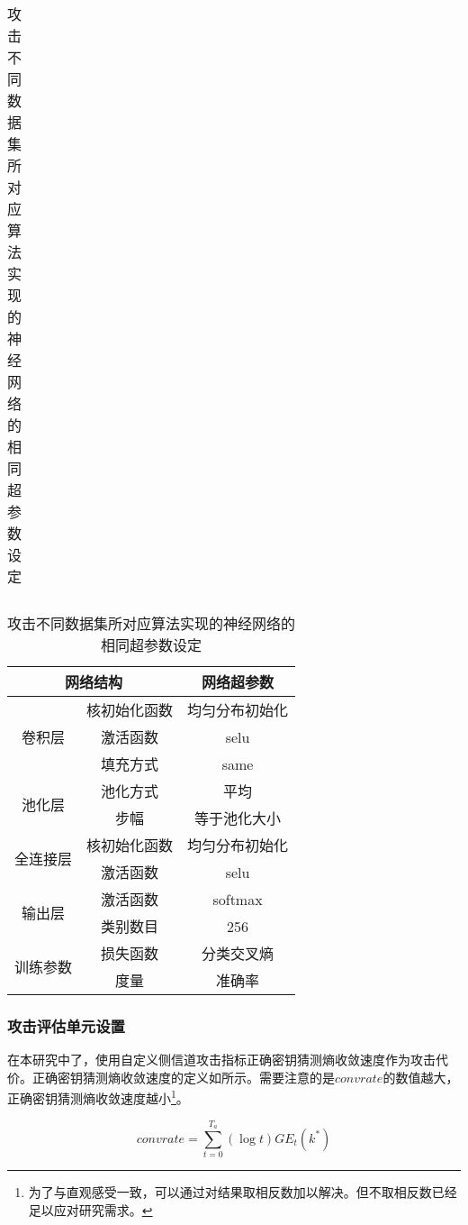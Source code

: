 {\begin{table}[!htb]
{\begin{subtable}[t]{\textwidth}
\begin{tabular}{cc|cccccc}
				\end{tabular}   
			\end{subtable}
		}
		
		\normalsize{
			\begin{subtable}[t]{\textwidth}
				\caption{攻击不同数据集所对应算法实现的神经网络的相同超参数设定}
				\centering
				\begin{tabular}{cc|c}
					\hline
					\multicolumn{2}{c|}{网络结构} &网络超参数\\
					\hline
					\hline
					\multirow{3}{*}{卷积层 }     &核初始化函数    &均匀分布初始化      \\
					                             &激活函数  &selu     \\
					                             &填充方式  &same     \\
					\hline
					\multirow{2}{*}{池化层 }     &池化方式    &平均              \\
					                             &步幅  &等于池化大小     \\
					\hline
					\multirow{2}{*}{全连接层}    &核初始化函数    &均匀分布初始化          \\
					                            &激活函数  &selu     \\
					\hline
					\multirow{2}{*}{输出层}      &激活函数    &softmax          \\
					                             &类别数目    &256                  \\
					\hline
					\multirow{2}{*}{训练参数}      &损失函数    &分类交叉熵          \\
				 	                               &度量       &准确率                  \\
					\hline
				\end{tabular}
			\end{subtable}
		}
	\end{table}
	\subsubsection{攻击评估单元设置}
	在本研究中了，使用自定义侧信道攻击指标正确密钥猜测熵收敛速度作为攻击代价。正确密钥猜测熵收敛速度的定义如所示。需要注意的是$convrate$的数值越大，正确密钥猜测熵收敛速度越小\footnote{为了与直观感受一致，可以通过对结果取相反数加以解决。但不取相反数已经足以应对研究需求。}。
	
	\begin{equation}\label{eq:mycost}
	convrate=\sum\limits_{t=0}^{T_a}(\log t)GE_t(k^*)
	\end{equation}
	
}
